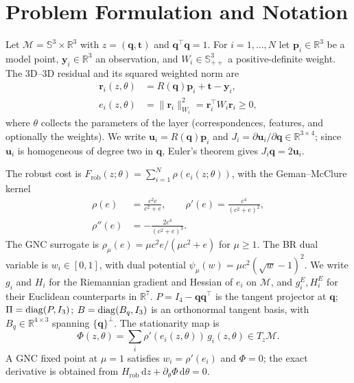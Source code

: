 \section{Problem Formulation and Notation}
\label{sec:formulation}

Let $\mathcal{M}=\mathbb{S}^3\times\mathbb{R}^3$ with $z=(\mathbf{q},\mathbf{t})$ and
$\mathbf{q}^\top\mathbf{q}=1$. For $i=1,\dots,N$ let $\mathbf{p}_i\in\mathbb{R}^3$ be a model
point, $\mathbf{y}_i\in\mathbb{R}^3$ an observation, and $W_i\in\mathbb{S}^3_{++}$ a
positive-definite weight. The 3D--3D residual and its squared weighted norm are
\begin{equation}
\begin{aligned}
\mathbf{r}_i(z,\theta)&=R(\mathbf{q})\mathbf{p}_i+\mathbf{t}-\mathbf{y}_i,\\
e_i(z,\theta)&=\|\mathbf{r}_i\|_{W_i}^2=\mathbf{r}_i^\top W_i\mathbf{r}_i\ge0,
\end{aligned}
\end{equation}
where $\theta$ collects the parameters of the layer (correspondences, features, and optionally the
weights). We write $\mathbf{u}_i=R(\mathbf{q})\mathbf{p}_i$ and
$J_i=\partial\mathbf{u}_i/\partial\mathbf{q}\in\mathbb{R}^{3\times4}$; since $\mathbf{u}_i$ is
homogeneous of degree two in $\mathbf{q}$, Euler's theorem gives $J_i\mathbf{q}=2\mathbf{u}_i$.

The robust cost is $F_{\mathrm{rob}}(z;\theta)=\sum_{i=1}^N\rho(e_i(z;\theta))$, with the
Geman--McClure kernel
\begin{equation}
\begin{aligned}
\rho(e)&=\frac{c^2e}{c^2+e},\qquad
\rho'(e)=\frac{c^4}{(c^2+e)^2},\\
\rho''(e)&=-\frac{2c^4}{(c^2+e)^3}.
\end{aligned}
\end{equation}
The GNC surrogate is $\rho_\mu(e)=\mu c^2e/(\mu c^2+e)$ for $\mu\ge1$. The BR dual variable is
$w_i\in[0,1]$, with dual potential $\psi_\mu(w)=\mu c^2(\sqrt{w}-1)^2$. We write $g_i$ and $H_i$
for the Riemannian gradient and Hessian \cite{absil2008} of $e_i$ on $\mathcal{M}$, and
$g_i^E,H_i^E$ for their Euclidean counterparts in $\mathbb{R}^7$. $P=I_4-\mathbf{q}\mathbf{q}^\top$
is the tangent projector at $\mathbf{q}$; $\Pi=\operatorname{diag}(P,I_3)$; $B=\operatorname{diag}(B_q,I_3)$ is an orthonormal
tangent basis, with $B_q\in\mathbb{R}^{4\times3}$ spanning $\{\mathbf{q}\}^{\perp}$. The
stationarity map is
\begin{equation}
\Phi(z,\theta)=\sum_i\rho'(e_i(z,\theta))\,g_i(z,\theta)\in T_z\mathcal{M}.
\label{eq:phi}
\end{equation}
A GNC fixed point at $\mu=1$ satisfies $w_i=\rho'(e_i)$ and $\Phi=0$; the exact derivative is
obtained from $H_{\mathrm{rob}}\,\mathrm{d}z+\partial_\theta\Phi\,\mathrm{d}\theta=0$.

